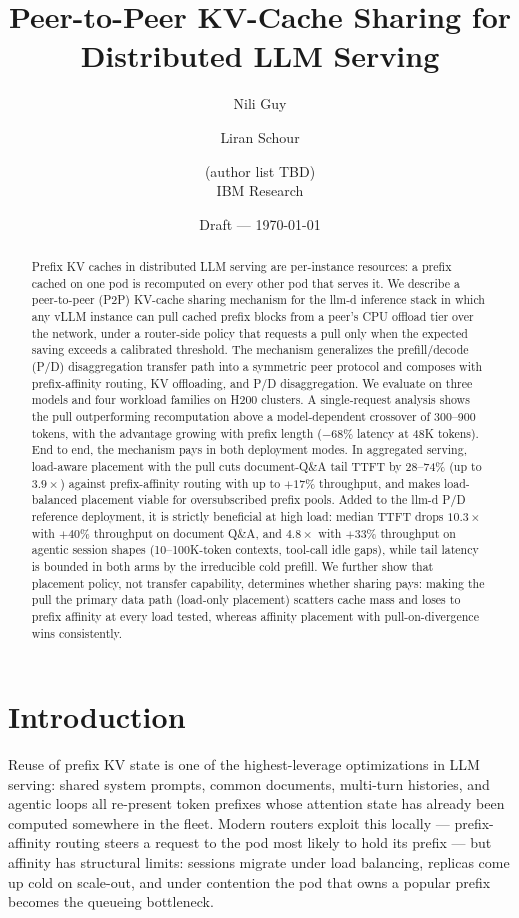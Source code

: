 \documentclass[twocolumn,10pt]{article}
\title{\bf Peer-to-Peer KV-Cache Sharing for Distributed LLM Serving}
\author{
  Nili Guy \and Liran Schour \and (author list TBD)\\[2pt]
  \normalsize IBM Research
}
\date{Draft --- \today}
\newcommand{\llmd}{llm-d}
\begin{document}
\maketitle

\begin{abstract}
Prefix KV caches in distributed LLM serving are per-instance resources:
a prefix cached on one pod is recomputed on every other pod that serves
it. We describe a peer-to-peer (P2P) KV-cache sharing mechanism for the
\llmd{} inference stack in which any vLLM instance can pull cached
prefix blocks from a peer's CPU offload tier over the network, under a
router-side policy that requests a pull only when the expected saving
exceeds a calibrated threshold. The mechanism generalizes the
prefill/decode (P/D) disaggregation transfer path into a symmetric peer
protocol and composes with prefix-affinity routing, KV offloading, and
P/D disaggregation. We evaluate on three models and four workload
families on H200 clusters. A single-request analysis shows the pull
outperforming recomputation above a model-dependent crossover of
300--900 tokens, with the advantage growing with prefix length ($-68\%$
latency at 48K tokens). End to end, the mechanism pays in both
deployment modes. In aggregated serving, load-aware placement with the
pull cuts document-Q\&A tail TTFT by 28--74\% (up to $3.9\times$)
against prefix-affinity routing with up to $+17\%$ throughput, and
makes load-balanced placement viable for oversubscribed prefix pools.
Added to the \llmd{} P/D reference deployment, it is strictly
beneficial at high load: median TTFT drops $10.3\times$ with $+40\%$
throughput on document Q\&A, and $4.8\times$ with $+33\%$ throughput
on agentic session shapes (10--100K-token contexts, tool-call idle
gaps), while tail latency is bounded in both arms by the irreducible
cold prefill. We further show that placement policy, not
transfer capability, determines whether sharing pays: making the pull
the primary data path (load-only placement) scatters cache mass and
loses to prefix affinity at every load tested, whereas affinity
placement with pull-on-divergence wins consistently.
\end{abstract}

\section{Introduction}
Reuse of prefix KV state is one of the highest-leverage optimizations
in LLM serving: shared system prompts, common documents, multi-turn
histories, and agentic loops all re-present token prefixes whose
attention state has already been computed somewhere in the fleet.
Modern routers exploit this locally --- prefix-affinity routing steers a
request to the pod most likely to hold its prefix --- but affinity has
structural limits: sessions migrate under load balancing, replicas come
up cold on scale-out, and under contention the pod that owns a popular
prefix becomes the queueing bottleneck.
\end{document}
